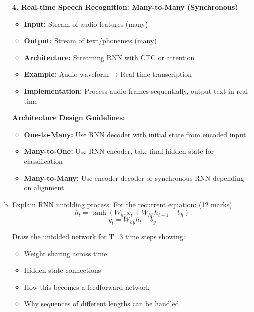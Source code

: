 \documentclass[12pt]{article}
\begin{document}
\begin{enumerate}[(a)]
{    \textbf{4. Real-time Speech Recognition: Many-to-Many (Synchronous)}
    \begin{itemize}
        \item \textbf{Input:} Stream of audio features (many)
        \item \textbf{Output:} Stream of text/phonemes (many)
        \item \textbf{Architecture:} Streaming RNN with CTC or attention
        \item \textbf{Example:} Audio waveform → Real-time transcription
        \item \textbf{Implementation:} Process audio frames sequentially, output text in real-time
    \end{itemize}
    
    \textbf{Architecture Design Guidelines:}
    \begin{itemize}
        \item \textbf{One-to-Many:} Use RNN decoder with initial state from encoded input
        \item \textbf{Many-to-One:} Use RNN encoder, take final hidden state for classification
        \item \textbf{Many-to-Many:} Use encoder-decoder or synchronous RNN depending on alignment
    \end{itemize}
    }
    
    \item Explain RNN unfolding process. For the recurrent equation: \hfill (12 marks)
    $$h_t = \tanh(W_{hx} x_t + W_{hh} h_{t-1} + b_h)$$
    $$y_t = W_{hy} h_t + b_y$$
    
    Draw the unfolded network for T=3 time steps showing:
    \begin{itemize}
        \item Weight sharing across time
        \item Hidden state connections
        \item How this becomes a feedforward network
        \item Why sequences of different lengths can be handled
    \end{itemize}
    
    \begin{center}
\end{center}
\end{enumerate}
\end{document}
